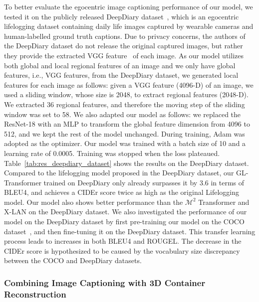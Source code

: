 \documentclass[journal]{IEEEtran}
\begin{document}
To better evaluate the egocentric image captioning performance of our model, we tested it on the publicly released DeepDiary dataset~\cite{fan2018deepdiary}, which is an egocentric lifelogging dataset containing daily life images captured by wearable cameras and human-labelled ground truth captions. Due to privacy concerns, the authors of the DeepDiary dataset do not release the original captured images, but rather they provide the extracted VGG feature~\cite{simonyan2014very} of each image. As our model utilizes both global and local regional features of an image and we only have global features, i.e., VGG features, from the DeepDiary dataset, we generated local features for each image as follows: given a VGG feature (4096-D) of an image, we used a sliding window, whose size is 2048, to extract regional features (2048-D). We extracted 36 regional features, and therefore the moving step of the sliding window was set to 58. We also adapted our model as follows: we replaced the ResNet-18 with an MLP to transform the global feature dimension from 4096 to 512, and we kept the rest of the model unchanged. During training, Adam was adopted as the optimizer. Our model was trained with a batch size of 10 and a learning rate of 0.0005. Training was stopped when the loss plateaued. Table~\ref{tab:res_deepdiary_dataset} shows the results on the DeepDiary dataset. Compared to the lifelogging model proposed in the DeepDiary dataset, our GL-Transformer trained on DeepDiary only already surpasses it by 3.6 in terms of BLEU4, and achieves a CIDEr score twice as high as the original Lifelogging model. Our model also shows better performance than the $\mathcal{M}^2$ Transformer and X-LAN on the DeepDiary dataset. We also investigated the performance of our model on the DeepDiary dataset by first pre-training our model on the COCO dataset~\cite{chen2015microsoft}, and then fine-tuning it on the DeepDiary dataset. This transfer learning process leads to increases in both BLEU4 and ROUGEL. The decrease in the CIDEr score is hypothesized to be caused by the vocabulary size discrepancy between the COCO and DeepDiary datasets. 

\subsubsection{Combining Image Captioning with 3D Container Reconstruction}\label{subsec:combine_cap_3d}
\end{document}
